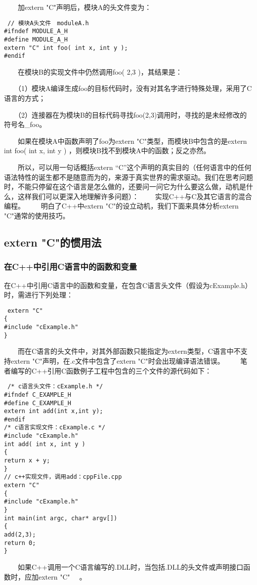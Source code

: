 　　加extern "C"声明后，模块A的头文件变为：
\begin{verbatim}
 // 模块A头文件　moduleA.h
#ifndef MODULE_A_H
#define MODULE_A_H
extern "C" int foo( int x, int y );
#endif
\end{verbatim} 

　　在模块B的实现文件中仍然调用foo( 2,3 )，其结果是：

　　（1）模块A编译生成foo的目标代码时，没有对其名字进行特殊处理，采用了C语言的方式；

　　（2）连接器在为模块B的目标代码寻找foo(2,3)调用时，寻找的是未经修改的符号名\_foo。

　　如果在模块A中函数声明了foo为extern "C"类型，而模块B中包含的是extern int foo( int x, int y ) ，则模块B找不到模块A中的函数；反之亦然。

　　所以，可以用一句话概括extern “C”这个声明的真实目的（任何语言中的任何语法特性的诞生都不是随意而为的，来源于真实世界的需求驱动。我们在思考问题时，不能只停留在这个语言是怎么做的，还要问一问它为什么要这么做，动机是什么，这样我们可以更深入地理解许多问题）：
　　实现C++与C及其它语言的混合编程。
　　明白了C++中extern "C"的设立动机，我们下面来具体分析extern "C"通常的使用技巧。
　　
\subsection{extern "C"的惯用法}
\subsubsection{在C++中引用C语言中的函数和变量}


在C++中引用C语言中的函数和变量，在包含C语言头文件（假设为cExample.h）时，需进行下列处理：
\begin{verbatim}
 extern "C"
{
#include "cExample.h"
}

\end{verbatim} 
　　而在C语言的头文件中，对其外部函数只能指定为extern类型，C语言中不支持extern "C"声明，在.c文件中包含了extern "C"时会出现编译语法错误。
　　笔者编写的C++引用C函数例子工程中包含的三个文件的源代码如下：
\begin{verbatim}
 /* c语言头文件：cExample.h */
#ifndef C_EXAMPLE_H
#define C_EXAMPLE_H
extern int add(int x,int y);
#endif
/* c语言实现文件：cExample.c */
#include "cExample.h"
int add( int x, int y )
{
return x + y;
}
// c++实现文件，调用add：cppFile.cpp
extern "C" 
{
#include "cExample.h"
}
int main(int argc, char* argv[])
{
add(2,3); 
return 0;
}

\end{verbatim} 
　　如果C++调用一个C语言编写的.DLL时，当包括.DLL的头文件或声明接口函数时，应加extern "C" {　}。
